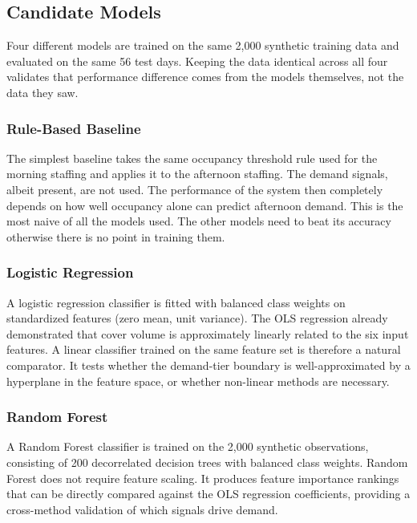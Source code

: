 \documentclass[12pt,a4paper,oneside]{article}
\begin{document}
\subsection{Candidate Models}

Four different models are trained on the same 2,000 synthetic training data and evaluated on the same 56 test days. Keeping the data identical across all four validates that performance difference comes from the models themselves, not the data they saw.

\subsubsection{Rule-Based Baseline}

The simplest baseline takes the same occupancy threshold rule used for the morning staffing and applies it to the afternoon staffing. The demand signals, albeit present, are not used. The performance of the system then completely depends on how well occupancy alone can predict afternoon demand. This is the most naive of all the models used. The other models need to beat its accuracy otherwise there is no point in training them.

\subsubsection{Logistic Regression}

A logistic regression classifier is fitted with balanced class weights on standardized features (zero mean, unit variance). The OLS regression already demonstrated that cover volume is approximately linearly related to the six input features. A linear classifier trained on the same feature set is therefore a natural comparator. It tests whether the demand-tier boundary is well-approximated by a hyperplane in the feature space, or whether non-linear methods are necessary.

\subsubsection{Random Forest}

A Random Forest classifier \citep{breiman2001} is trained on the 2,000 synthetic observations, consisting of 200 decorrelated decision trees with balanced class weights. Random Forest does not require feature scaling. It produces feature importance rankings that can be directly compared against the OLS regression coefficients, providing a cross-method validation of which signals drive demand.
\end{document}
